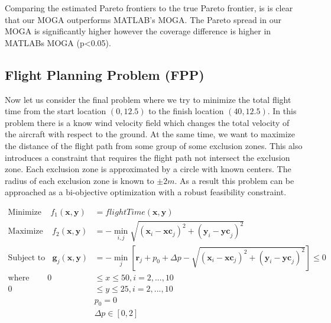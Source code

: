 \documentclass{article}
\begin{document}
\noindent Comparing the estimated Pareto frontiers to the true Pareto frontier, is is clear that our MOGA outperforms MATLAB's MOGA. The Pareto spread in our MOGA is significantly higher however the coverage difference is higher in MATLABs MOGA (p<0.05).
 
\subsection{Flight Planning Problem (FPP)}
Now let us consider the final problem where we try to minimize the total flight time from the start location $(0,12.5)$ to the finish location $(40,12.5)$.  In this problem there is a know wind velocity field which changes the total velocity of the aircraft with respect to the ground.  At the same time, we want to maximize the distance of the flight path from some group of some exclusion zones. This also introduces a constraint that requires the flight path not intersect the exclusion zone. Each exclusion zone is approximated by a circle with known centers.  The radius of each exclusion zone is known to $\pm 2m$.  As a result this problem can be approached as a bi-objective optimization with a robust feasibility constraint. 

\begin{align*}
\textrm{Minimize} ~~~~~ f_1(\textbf{x},\textbf{y}) &= flightTime(\textbf{x},\textbf{y})\\
\textrm{Maximize} ~~~~~ f_2(\textbf{x},\textbf{y}) &= -\min_{i,j}\sqrt{(\textbf{x}_i-\textbf{xc}_j)^2 + (\textbf{y}_i-\textbf{yc}_j)^2}\\
\textrm{Subject to} ~~~~ \textbf{g}_j(\textbf{x},\textbf{y}) &= -\min_{j}\left[\textbf{r}_j+p_0 + \Delta p -\sqrt{(\textbf{x}_i-\textbf{xc}_j)^2 + (\textbf{y}_i-\textbf{yc}_j)^2}\right]   \leq 0 \\
\textrm{where} ~~~~~~~~~~ 
0 &\leq  x \leq 50, i = 2,...,10 \\
0 &\leq  y  \leq 25, i = 2,...,10 \\
&p_0 = 0\\
&\Delta p \in [0,2] \\
\end{align*}
\end{document}
